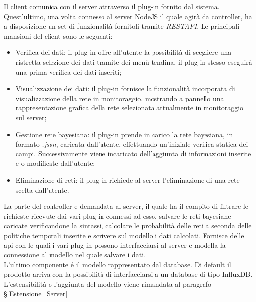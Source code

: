 Il client comunica con il server attraverso il plug-in fornito dal sistema. Quest'ultimo, una volta connesso al server NodeJS il quale agirà da controller, ha a disposizione un set di funzionalità fornitoli tramite \textit{REST}\glossario \textit{API}\glossario . Le principali mansioni del client sono le seguenti: 
\begin{itemize}
	\item Verifica dei dati: il plug-in offre all'utente la possibilità di scegliere una ristretta selezione dei dati tramite dei menù tendina, il plug-in stesso eseguirà una prima verifica dei dati inseriti;
	\item Visualizzazione dei dati: il plug-in fornisce la funzionalità incorporata di visualizzazione della rete in monitoraggio, mostrando a pannello una rappresentazione grafica della rete selezionata attualmente in monitoraggio sul server;
	\item Gestione rete bayesiana: il plug-in prende in carico la rete bayesiana, in formato \textit{.json}, caricata dall'utente, effettuando un'iniziale verifica statica dei campi. Successivamente viene incaricato dell'aggiunta di informazioni inserite e o modificate dall'utente; 
	\item Eliminazione di reti: il plug-in richiede al server l'eliminazione di una rete scelta dall'utente. 
\end{itemize}
La parte del controller e demandata al server, il quale ha il compito di filtrare le richieste ricevute dai vari plug-in connessi ad esso, salvare le reti bayesiane caricate verificandone la sintassi, calcolare le probabilità delle reti a seconda delle politiche temporali inserite e scrivere sul modello i dati calcolati. 
Fornisce delle api con le quali i vari plug-in possono interfacciarsi al server e modella la connessione al modello nel quale salvare i dati. \\ 
L'ultimo componente é il modello rappresentato dal database. Di default il prodotto arriva con la possibilità di interfacciarsi a un database
di tipo InfluxDB. L'estensibilità o l'aggiunta del modello viene rimandata al paragrafo §\ref{Estensione_Server}


